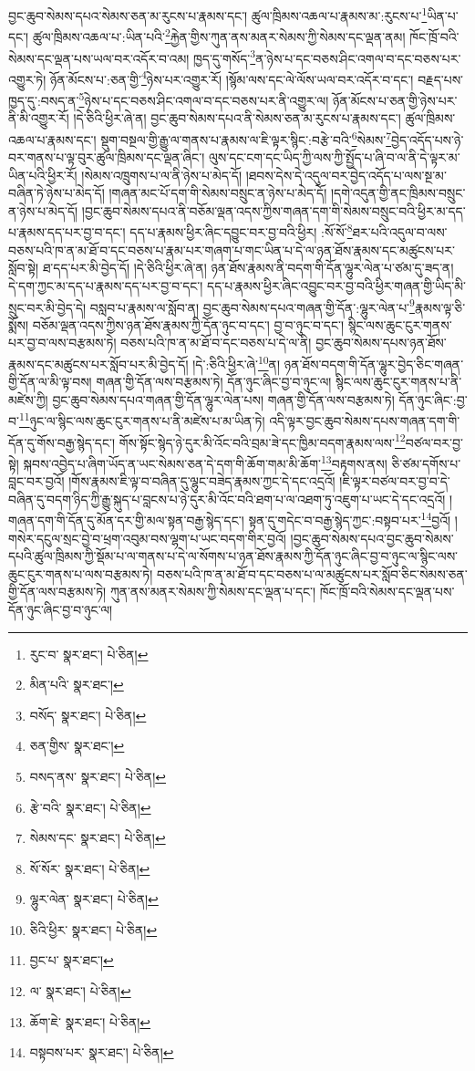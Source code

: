 བྱང་ཆུབ་སེམས་དཔའ་སེམས་ཅན་མ་རུངས་པ་རྣམས་དང་། ཚུལ་ཁྲིམས་འཆལ་པ་རྣམས་མ་:རུངས་པ་\footnote{རུང་བ་  སྣར་ཐང་།  པེ་ཅིན། }ཡིན་པ་དང་། ཚུལ་ཁྲིམས་འཆལ་པ་:ཡིན་པའི་\footnote{མིན་པའི་  སྣར་ཐང་། }རྐྱེན་གྱིས་ཀུན་ནས་མནར་སེམས་ཀྱི་སེམས་དང་ལྡན་ནམ། ཁོང་ཁྲོ་བའི་སེམས་དང་ལྡན་པས་ཡལ་བར་འདོར་བ་འམ། ཁྱད་དུ་གསོད་\footnote{བསོད་  སྣར་ཐང་།  པེ་ཅིན། }ན་ཉེས་པ་དང་བཅས་ཤིང་འགལ་བ་དང་བཅས་པར་འགྱུར་ཏེ། ཉོན་མོངས་པ་:ཅན་གྱི་\footnote{ཅན་གྱིས་  སྣར་ཐང་། }ཉེས་པར་འགྱུར་རོ། །སྙོམ་ལས་དང་ལེ་ལོས་ཡལ་བར་འདོར་བ་དང་། བརྗད་པས་ཁྱད་དུ་:བསད་ན་\footnote{བསད་ནས་  སྣར་ཐང་།  པེ་ཅིན། }ཉེས་པ་དང་བཅས་ཤིང་འགལ་བ་དང་བཅས་པར་ནི་འགྱུར་ལ། ཉོན་མོངས་པ་ཅན་གྱི་ཉེས་པར་ནི་མི་འགྱུར་རོ། །དེ་ཅིའི་ཕྱིར་ཞེ་ན། བྱང་ཆུབ་སེམས་དཔའ་ནི་སེམས་ཅན་མ་རུངས་པ་རྣམས་དང་། ཚུལ་ཁྲིམས་འཆལ་པ་རྣམས་དང་། སྡུག་བསྔལ་གྱི་རྒྱུ་ལ་གནས་པ་རྣམས་ལ་ཇི་ལྟར་སྙིང་:བརྩེ་བའི་\footnote{རྩེ་བའི་  སྣར་ཐང་།  པེ་ཅིན། }སེམས་\footnote{སེམས་དང་  སྣར་ཐང་།  པེ་ཅིན། }བྱེད་འདོད་པས་ཉེ་བར་གནས་པ་ལྟ་བུར་ཚུལ་ཁྲིམས་དང་ལྡན་ཞིང་། ལུས་དང་ངག་དང་ཡིད་ཀྱི་ལས་ཀྱི་སྤྱོད་པ་ཞི་བ་ལ་ནི་དེ་ལྟར་མ་ཡིན་པའི་ཕྱིར་རོ། །སེམས་འཁྲུགས་པ་ལ་ནི་ཉེས་པ་མེད་དོ། །ཐབས་དེས་དེ་འདུལ་བར་བྱེད་འདོད་པ་ལས་སྔ་མ་བཞིན་ཏེ་ཉེས་པ་མེད་དོ། །གཞན་མང་པོ་དག་གི་སེམས་བསྲུང་ན་ཉེས་པ་མེད་དོ། །དགེ་འདུན་གྱི་ནང་ཁྲིམས་བསྲུང་ན་ཉེས་པ་མེད་དོ། །བྱང་ཆུབ་སེམས་དཔའ་ནི་བཅོམ་ལྡན་འདས་ཀྱིས་གཞན་དག་གི་སེམས་བསྲུང་བའི་ཕྱིར་མ་དད་པ་རྣམས་དད་པར་བྱ་བ་དང་། དད་པ་རྣམས་ཕྱིར་ཞིང་དབྱུང་བར་བྱ་བའི་ཕྱིར། :སོ་སོ་\footnote{སོ་སོར་  སྣར་ཐང་།  པེ་ཅིན། }ཐར་པའི་འདུལ་བ་ལས་བཅས་པའི་ཁ་ན་མ་ཐོ་བ་དང་བཅས་པ་རྣམ་པར་གཞག་པ་གང་ཡིན་པ་དེ་ལ་ཉན་ཐོས་རྣམས་དང་མཚུངས་པར་སློབ་སྟེ། ཐ་དད་པར་མི་བྱེད་དོ། །དེ་ཅིའི་ཕྱིར་ཞེ་ན། ཉན་ཐོས་རྣམས་ནི་བདག་གི་དོན་ལྷུར་ལེན་པ་ཙམ་དུ་ཟད་ན། དེ་དག་ཀྱང་མ་དད་པ་རྣམས་དད་པར་བྱ་བ་དང་། དད་པ་རྣམས་ཕྱིར་ཞིང་འབྱུང་བར་བྱ་བའི་ཕྱིར་གཞན་གྱི་ཡིད་མི་སྲུང་བར་མི་བྱེད་དེ། བསླབ་པ་རྣམས་ལ་སློབ་ན། བྱང་ཆུབ་སེམས་དཔའ་གཞན་གྱི་དོན་:ལྷུར་ལེན་པ་\footnote{ལྷུར་ལེན་  སྣར་ཐང་།  པེ་ཅིན། }རྣམས་ལྟ་ཅི་སྨོས། བཅོམ་ལྡན་འདས་ཀྱིས་ཉན་ཐོས་རྣམས་ཀྱི་དོན་ཉུང་བ་དང་། བྱ་བ་ཉུང་བ་དང་། སྙིང་ལས་ཆུང་ངུར་གནས་པར་བྱ་བ་ལས་བརྩམས་ཏེ། བཅས་པའི་ཁ་ན་མ་ཐོ་བ་དང་བཅས་པ་དེ་ལ་ནི། བྱང་ཆུབ་སེམས་དཔས་ཉན་ཐོས་རྣམས་དང་མཚུངས་པར་སློབ་པར་མི་བྱེད་དོ། །དེ་:ཅིའི་ཕྱིར་ཞེ་\footnote{ཅིའི་ཕྱིར་  སྣར་ཐང་།  པེ་ཅིན། }ན། ཉན་ཐོས་བདག་གི་དོན་ལྷུར་བྱེད་ཅིང་གཞན་གྱི་དོན་ལ་མི་ལྟ་བས། གཞན་གྱི་དོན་ལས་བརྩམས་ཏེ། དོན་ཉུང་ཞིང་བྱ་བ་ཉུང་ལ། སྙིང་ལས་ཆུང་ངུར་གནས་པ་ནི་མཛེས་ཀྱི། བྱང་ཆུབ་སེམས་དཔའ་གཞན་གྱི་དོན་ལྷུར་ལེན་པས། གཞན་གྱི་དོན་ལས་བརྩམས་ཏེ། དོན་ཉུང་ཞིང་:བྱ་བ་\footnote{བྱང་པ་  སྣར་ཐང་། }ཉུང་ལ་སྙིང་ལས་ཆུང་ངུར་གནས་པ་ནི་མཛེས་པ་མ་ཡིན་ཏེ། འདི་ལྟར་བྱང་ཆུབ་སེམས་དཔས་གཞན་དག་གི་དོན་དུ་གོས་བརྒྱ་སྙེད་དང་། གོས་སྟོང་སྙེད་ཉེ་དུར་མི་འོང་བའི་བྲམ་ཟེ་དང་ཁྱིམ་བདག་རྣམས་ལས་\footnote{ལ་  སྣར་ཐང་།  པེ་ཅིན། }བཙལ་བར་བྱ་སྟེ། སྐབས་འབྱེད་པ་ཞིག་ཡོད་ན་ཡང་སེམས་ཅན་དེ་དག་གི་ཆོག་གམ་མི་ཆོག་\footnote{ཆོག་ཇེ་  སྣར་ཐང་།  པེ་ཅིན། }བརྟགས་ནས། ཅི་ཙམ་དགོས་པ་བླང་བར་བྱའོ། །གོས་རྣམས་ཇི་ལྟ་བ་བཞིན་དུ་ལྷུང་བཟེད་རྣམས་ཀྱང་དེ་དང་འདྲའོ། །ཇི་ལྟར་བཙལ་བར་བྱ་བ་དེ་བཞིན་དུ་བདག་ཉིད་ཀྱི་རྒྱུ་སྐུད་པ་བླངས་པ་ཉེ་དུར་མི་འོང་བའི་ཐག་པ་ལ་འཐག་ཏུ་འཇུག་པ་ཡང་དེ་དང་འདྲའོ། །གཞན་དག་གི་དོན་དུ་མོན་དར་གྱི་མལ་སྟན་བརྒྱ་སྙེད་དང་། སྟན་དུ་གདེང་བ་བརྒྱ་སྙེད་ཀྱང་:བསྟབ་པར་\footnote{བསྟབས་པར་  སྣར་ཐང་།  པེ་ཅིན། }བྱའོ། །གསེར་དངུལ་སྲང་བྱེ་བ་ཕྲག་འབུམ་བས་ལྷག་པ་ཡང་བདག་གིར་བྱའོ། །བྱང་ཆུབ་སེམས་དཔའ་བྱང་ཆུབ་སེམས་དཔའི་ཚུལ་ཁྲིམས་ཀྱི་སྡོམ་པ་ལ་གནས་པ་དེ་ལ་སོགས་པ་ཉན་ཐོས་རྣམས་ཀྱི་དོན་ཉུང་ཞིང་བྱ་བ་ཉུང་ལ་སྙིང་ལས་ཆུང་ངུར་གནས་པ་ལས་བརྩམས་ཏེ། བཅས་པའི་ཁ་ན་མ་ཐོ་བ་དང་བཅས་པ་ལ་མཚུངས་པར་སློབ་ཅིང་སེམས་ཅན་གྱི་དོན་ལས་བརྩམས་ཏེ། ཀུན་ནས་མནར་སེམས་ཀྱི་སེམས་དང་ལྡན་པ་དང་། ཁོང་ཁྲོ་བའི་སེམས་དང་ལྡན་པས་དོན་ཉུང་ཞིང་བྱ་བ་ཉུང་ལ། 